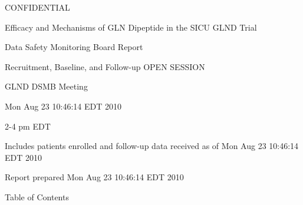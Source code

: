 \documentclass[dvips,10pt]{article}
\begin{document}
\vspace*{1in}
\begin{center}
{\Huge{CONFIDENTIAL}}
\end{center}
\vspace*{0.5in}
\begin{center}
{\Huge{Efficacy and Mechanisms of GLN Dipeptide in the SICU GLND Trial}}
\end{center}
\vspace*{0.5in}
\begin{center}
{\Huge{Data Safety Monitoring Board Report}}
\end{center}
\vspace*{0.25in}
\begin{center}
{\Huge{
Recruitment, Baseline, and Follow-up  OPEN SESSION
}}
\end{center}
\vspace*{1in}
\begin{center}
{\Huge{GLND DSMB Meeting}}
\end{center}
\begin{center}
{\Huge{
Mon Aug 23 10:46:14 EDT 2010
}}
\end{center}
\begin{center}
{\Huge{2-4 pm EDT}}
\end{center}
\vspace*{1in}
\begin{center}
\noindent
{\Large{Includes patients enrolled and follow-up data received as of Mon Aug 23 10:46:14 EDT 2010}}
\end{center}
\vspace*{0.5in}
\begin{center}
{\Large{Report prepared  Mon Aug 23 10:46:14 EDT 2010 }}
\end{center}
\clearpage
\vspace*{1in}
\begin{center}
{\Huge{Table of Contents}}
\end{center}
\listoftables
\listoffigures
\clearpage
\end{document}
